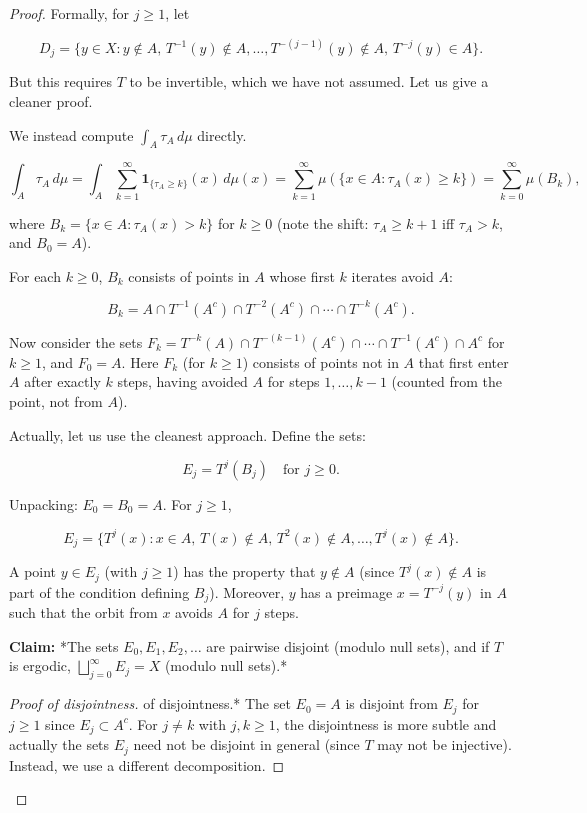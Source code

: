 \begin{proof}
Formally, for $j \ge 1$, let

\[
D_j = \{y \in X : y \notin A, \, T^{-1}(y) \notin A, \ldots, T^{-(j-1)}(y) \notin A, \, T^{-j}(y) \in A\}.
\]

But this requires $T$ to be invertible, which we have not assumed. Let us give a cleaner proof.

We instead compute $\int_A \tau_A \, d\mu$ directly.

\[
\int_A \tau_A \, d\mu = \int_A \sum_{k=1}^{\infty} \mathbf{1}_{\{\tau_A \ge k\}}(x) \, d\mu(x) = \sum_{k=1}^{\infty} \mu(\{x \in A : \tau_A(x) \ge k\}) = \sum_{k=0}^{\infty} \mu(B_k),
\]

where $B_k = \{x \in A : \tau_A(x) > k\}$ for $k \ge 0$ (note the shift: $\tau_A \ge k+1$ iff $\tau_A > k$, and $B_0 = A$).

For each $k \ge 0$, $B_k$ consists of points in $A$ whose first $k$ iterates avoid $A$:

\[
B_k = A \cap T^{-1}(A^c) \cap T^{-2}(A^c) \cap \cdots \cap T^{-k}(A^c).
\]

Now consider the sets $F_k = T^{-k}(A) \cap T^{-(k-1)}(A^c) \cap \cdots \cap T^{-1}(A^c) \cap A^c$ for $k \ge 1$, and $F_0 = A$. Here $F_k$ (for $k \ge 1$) consists of points not in $A$ that first enter $A$ after exactly $k$ steps, having avoided $A$ for steps $1, \ldots, k-1$ (counted from the point, not from $A$).

Actually, let us use the cleanest approach. Define the sets:

\[
E_j = T^j(B_j) \quad \text{for } j \ge 0.
\]

Unpacking: $E_0 = B_0 = A$. For $j \ge 1$,

\[
E_j = \{T^j(x) : x \in A, \, T(x) \notin A, \, T^2(x) \notin A, \ldots, T^j(x) \notin A\}.
\]

A point $y \in E_j$ (with $j \ge 1$) has the property that $y \notin A$ (since $T^j(x) \notin A$ is part of the condition defining $B_j$). Moreover, $y$ has a preimage $x = T^{-j}(y)$ in $A$ such that the orbit from $x$ avoids $A$ for $j$ steps.

\textbf{Claim:} *The sets $E_0, E_1, E_2, \ldots$ are pairwise disjoint (modulo null sets), and if $T$ is ergodic, $\bigsqcup_{j=0}^\infty E_j = X$ (modulo null sets).*

\begin{proof}[Proof of disjointness]
of disjointness.* The set $E_0 = A$ is disjoint from $E_j$ for $j \ge 1$ since $E_j \subset A^c$. For $j \ne k$ with $j, k \ge 1$, the disjointness is more subtle and actually the sets $E_j$ need not be disjoint in general (since $T$ may not be injective). Instead, we use a different decomposition.


\end{proof}
\end{proof}
